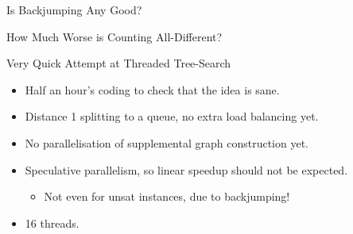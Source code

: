 \documentclass{beamer}
\begin{document}
\begin{frame}{Is Backjumping Any Good?}
    
\end{frame}

\begin{frame}{How Much Worse is Counting All-Different?}
    
\end{frame}

\begin{frame}{Very Quick Attempt at Threaded Tree-Search}
     {
        \begin{itemize}
            \item Half an hour's coding to check that the idea is sane.
            \item Distance 1 splitting to a queue, no extra load balancing yet.
            \item No parallelisation of supplemental graph construction yet.
            \item Speculative parallelism, so linear speedup should not be expected.
                \begin{itemize}
                    \item Not even for unsat instances, due to backjumping!
                \end{itemize}
            \item 16 threads.
        \end{itemize}
    }

     {
        
    }

     {
        
    }
\end{frame}

\section{}
\end{document}
